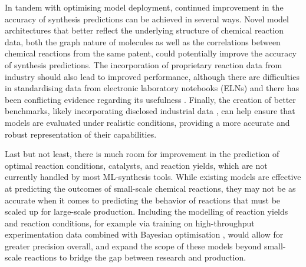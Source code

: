 In tandem with optimising model deployment, continued improvement in the accuracy of synthesis predictions can be achieved in several ways. Novel model architectures that better reflect the underlying structure of chemical reaction data, both the graph nature of molecules as well as the correlations between chemical reactions from the same patent, could potentially improve the accuracy of synthesis predictions. The incorporation of proprietary reaction data from industry should also lead to improved performance, although there are difficulties in standardising data from electronic laboratory notebooks (ELNs) \cite{Jablonka2022OpenChemistry} and there has been conflicting evidence regarding its usefulness \cite{Thakkar2020DatasetsSynthesis, Wiest2023DatasetYields}. Finally, the creation of better benchmarks, likely incorporating disclosed industrial data \cite{Kearnes2021OpenReaction}, can help ensure that models are evaluated under realistic conditions, providing a more accurate and robust representation of their capabilities.

Last but not least, there is much room for improvement in the prediction of optimal reaction conditions, catalysts, and reaction yields, \cite{Ahneman2018PredictingCoupling, Schwaller2021YieldPrediction, Probst2022ReactionClassification} which are not currently handled by most ML-synthesis tools. While existing models are effective at predicting the outcomes of small-scale chemical reactions, they may not be as accurate when it comes to predicting the behavior of reactions that must be scaled up for large-scale production. Including the modelling of reaction yields and reaction conditions, for example via training on high-throughput experimentation data \cite{king2022probing, xu2022roadmap} combined with Bayesian optimisation \cite{Shields2021BayesOptReaction}, would allow for greater precision overall, and expand the scope of these models beyond small-scale reactions to bridge the gap between research and production.

